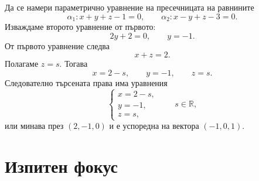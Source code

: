 \begin{example}
Да се намери параметрично уравнение на пресечницата на равнините
\[
\alpha_1:x+y+z-1=0,
\qquad
\alpha_2:x-y+z-3=0.
\]
Изваждаме второто уравнение от първото:
\[
2y+2=0,\qquad y=-1.
\]
От първото уравнение следва
\[
x+z=2.
\]
Полагаме $z=s$. Тогава
\[
x=2-s,\qquad y=-1,\qquad z=s.
\]
Следователно търсената права има уравнения
\[
\begin{cases}
x=2-s,\\
y=-1,\\
z=s,
\end{cases}
\qquad s\in\mathbb R,
\]
или минава през $(2,-1,0)$ и е успоредна на вектора $(-1,0,1)$.
\end{example}

\section{Изпитен фокус}\label{s:29.7}

